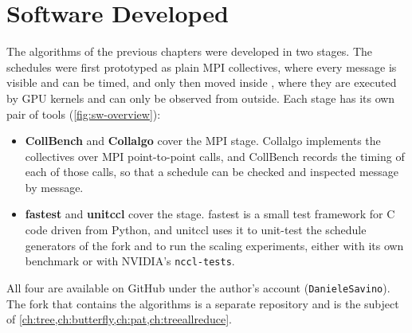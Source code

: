 
\chapter{Software Developed}\label{ch:software}

The algorithms of the previous chapters were developed in two stages.
The schedules were first prototyped as plain MPI collectives, where every message is visible and can be timed, and only then moved inside \nccl{}, where they are executed by GPU kernels and can only be observed from outside.
Each stage has its own pair of tools (\cref{fig:sw-overview}):
\begin{itemize}
  \item \textbf{CollBench} and \textbf{Collalgo} cover the MPI stage. Collalgo implements the \bine{} collectives over MPI point-to-point calls, and CollBench records the timing of each of those calls, so that a schedule can be checked and inspected message by message.
  \item \textbf{fastest} and \textbf{unitccl} cover the \nccl{} stage. fastest is a small test framework for C code driven from Python, and unitccl uses it to unit-test the schedule generators of the \nccl{} fork and to run the scaling experiments, either with its own benchmark or with NVIDIA's \texttt{nccl-tests}.
\end{itemize}
All four are available on GitHub under the author's account (\texttt{DanieleSavino}). The \nccl{} fork that contains the algorithms is a separate repository and is the subject of \cref{ch:tree,ch:butterfly,ch:pat,ch:treeallreduce}.

